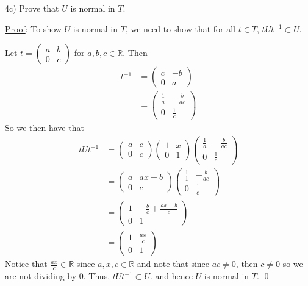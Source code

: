 \documentclass{article}
\begin{document}
4c) Prove that $U$ is normal in $T$. 

\underline{Proof}: To show $U$ is normal in $T$, we need to show that for all $t \in T$, $tUt^{-1} \subset U$. 

Let $t = 
\begin{pmatrix}
	a & b \\
	0 & c
\end{pmatrix}$ for $a, b, c \in \mathbb{R}$. Then 
\begin{align*}
	t^{-1} &=
	\begin{pmatrix}
		c & -b \\
		0 & a
	\end{pmatrix} \\
	&=
	\begin{pmatrix}
		\frac{1}{a} & -\frac{b}{ac} \\[6pt]
		0 & \frac{1}{c}
	\end{pmatrix}	
\end{align*}
So we then have that 
\begin{align*}
	tUt^{-1} &=
	\begin{pmatrix}
		a & c \\
		0 & c
	\end{pmatrix}
	\begin{pmatrix}
		1 & x \\
		0 & 1
	\end{pmatrix}
	\begin{pmatrix}
		\frac{1}{a} & -\frac{b}{ac} \\[6pt]
		0 & \frac{1}{c}
	\end{pmatrix}\\
	&=
	\begin{pmatrix}
		a & ax + b \\
		0 & c
	\end{pmatrix}
	\begin{pmatrix}
		\frac{1}{1} & -\frac{b}{ac} \\[6pt]
		0 & \frac{1}{c}
	\end{pmatrix} \\
	&=
	\begin{pmatrix}
		1 & -\frac{b}{c} + \frac{ax+b}{c} \\[6pt]
		0 & 1
	\end{pmatrix} \\	
	&=
	\begin{pmatrix}
		1 & \frac{ax}{c} \\[6pt]
		0 & 1
	\end{pmatrix}	
\end{align*}
Notice that $\frac{ax}{c} \in \mathbb{R}$ since $a, x, c \in \mathbb{R}$ and note that since $ac \neq 0$, then $c \neq 0$ so we are not dividing by $0$. Thus, $tUt^{-1} \subset U.$ and hence $U$ is normal in $T$. \qed \\
\end{document}

